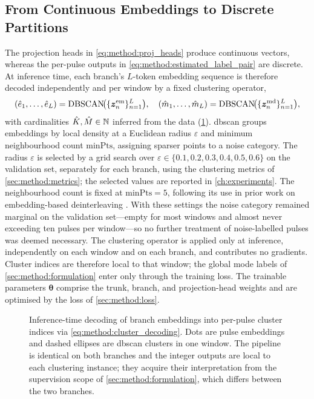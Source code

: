 \subsection*{From Continuous Embeddings to Discrete Partitions}

The projection heads in \cref{eq:method:proj_heads} produce continuous vectors, whereas the per-pulse outputs in \cref{eq:method:estimated_label_pair} are discrete.
At inference time, each branch's $L$-token embedding sequence is therefore decoded independently and per window by a fixed clustering operator,
\begin{equation}\label{eq:method:cluster_decoding}
  (\hat{e}_1,\ldots,\hat{e}_L) = \mathrm{DBSCAN}\!\bigl(\{\bm{z}^{\mathrm{em}}_n\}_{n=1}^{L}\bigr),
  \quad
  (\hat{m}_1,\ldots,\hat{m}_L) = \mathrm{DBSCAN}\!\bigl(\{\bm{z}^{\mathrm{md}}_n\}_{n=1}^{L}\bigr),
\end{equation}
with cardinalities $\hat{K},\hat{M} \in \mathbb{N}$ inferred from the data (\cref{fig:method:cluster_decoding}).
\Gls{dbscan} \parencite{ester1996density} groups embeddings by local density at a Euclidean radius $\varepsilon$ and minimum neighbourhood count $\mathrm{minPts}$, assigning sparser points to a noise category.
The radius $\varepsilon$ is selected by a grid search over $\varepsilon \in \{0.1, 0.2, 0.3, 0.4, 0.5, 0.6\}$ on the validation set, separately for each branch, using the clustering metrics of \cref{sec:method:metrics}; the selected values are reported in \cref{ch:experiments}.
The neighbourhood count is fixed at $\mathrm{minPts} = 5$, following its use in prior work on embedding-based deinterleaving \parencite{gunn2025deinterleaving}.
With these settings the noise category remained marginal on the validation set---empty for most windows and almost never exceeding ten pulses per window---so no further treatment of noise-labelled pulses was deemed necessary.
The clustering operator is applied only at inference, independently on each window and on each branch, and contributes no gradients.
Cluster indices are therefore local to that window; the global mode labels of \cref{sec:method:formulation} enter only through the training loss.
The trainable parameters $\bm{\theta}$ comprise the trunk, branch, and projection-head weights and are optimised by the loss of \cref{sec:method:loss}.

\begin{figure}[tbp]
  \centering
  
  \caption{Inference-time decoding of branch embeddings into per-pulse cluster indices via \cref{eq:method:cluster_decoding}. Dots are pulse embeddings and dashed ellipses are \gls{dbscan} clusters in one window. The pipeline is identical on both branches and the integer outputs are local to each clustering instance; they acquire their interpretation from the supervision scope of \cref{sec:method:formulation}, which differs between the two branches.}
  \label{fig:method:cluster_decoding}
\end{figure}
